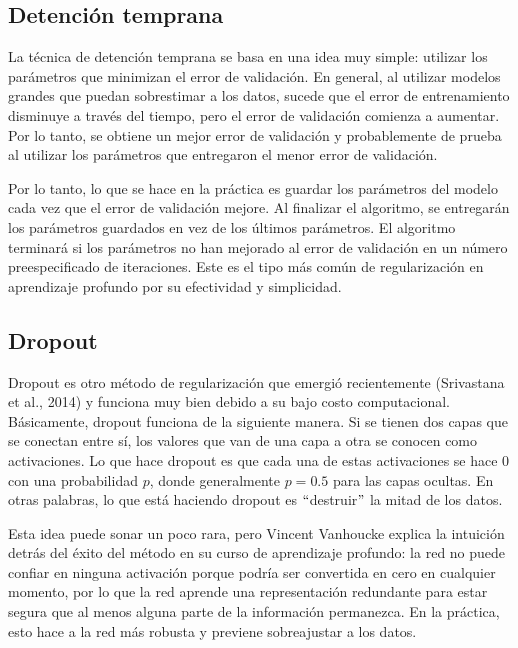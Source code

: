 \subsection{Detención temprana}
La técnica de detención temprana se basa en una idea muy simple: utilizar los parámetros que minimizan el error de validación. En general, al utilizar modelos grandes que puedan sobrestimar a los datos, sucede que el error de entrenamiento disminuye a través del tiempo, pero el error de validación comienza a aumentar. Por lo tanto, se obtiene un mejor error de validación y probablemente de prueba al utilizar los parámetros que entregaron el menor error de validación.
\cite{goodfellow-et-al-2016}

\vspace{1em}

Por lo tanto, lo que se hace en la práctica es guardar los parámetros del modelo cada vez que el error de validación mejore. Al finalizar el algoritmo, se entregarán los parámetros guardados en vez de los últimos parámetros. El algoritmo terminará si los parámetros no han mejorado al error de validación en un número preespecificado de iteraciones. Este es el tipo más común de regularización en aprendizaje profundo por su efectividad y simplicidad.
\cite{goodfellow-et-al-2016}

\subsection{Dropout}
Dropout es otro método de regularización que emergió recientemente (Srivastana et al., 2014) y funciona muy bien debido a su bajo costo computacional. Básicamente, dropout funciona de la siguiente manera. Si se tienen dos capas que se conectan entre sí, los valores que van de una capa a otra se conocen como activaciones. Lo que hace dropout es que cada una de estas activaciones se hace 0 con una probabilidad $p$, donde generalmente $p=0.5$ para las capas ocultas. En otras palabras, lo que está haciendo dropout es $``$destruir$"$ la mitad de los datos.
\cite{goodfellow-et-al-2016}
\cite{Srivastava:2014:DSW:2627435.2670313}
\cite{deeplearningbygoogle}

\vspace{1em}

Esta idea puede sonar un poco rara, pero Vincent Vanhoucke explica la intuición detrás del éxito del método en su curso de aprendizaje profundo: la red no puede confiar en ninguna activación porque podría ser convertida en cero en cualquier momento, por lo que la red aprende una representación redundante para estar segura que al menos alguna parte de la información permanezca. En la práctica, esto hace a la red más robusta y previene sobreajustar a los datos. 
\cite{goodfellow-et-al-2016}
\cite{deeplearningbygoogle}

